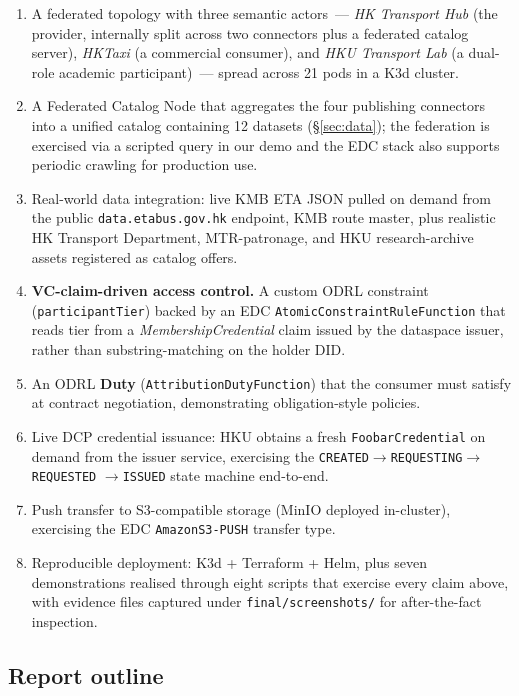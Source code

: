 \documentclass[11pt,a4paper]{article}
\DeclareRobustCommand{\code}[1]{\texttt{\small #1}}
\begin{document}
\begin{enumerate}
  \item A federated topology with three semantic actors~--- \emph{HK Transport
    Hub} (the provider, internally split across two connectors plus a federated
    catalog server), \emph{HKTaxi} (a commercial consumer), and \emph{HKU
    Transport Lab} (a dual-role academic participant)~--- spread across 21
    pods in a K3d cluster.
  \item A Federated Catalog Node that aggregates the four publishing
    connectors into a unified catalog containing 12 datasets
    (§\ref{sec:data}); the federation is exercised via a scripted query
    in our demo and the EDC stack also supports periodic crawling for
    production use.
  \item Real-world data integration: live KMB ETA JSON pulled on demand from
    the public \code{data.etabus.gov.hk} endpoint, KMB route master, plus
    realistic HK Transport Department, MTR-patronage, and HKU research-archive
    assets registered as catalog offers.
  \item \textbf{VC-claim-driven access control.} A custom ODRL constraint
    (\code{participantTier}) backed by an EDC
    \code{AtomicConstraintRuleFunction} that reads tier from a
    \emph{MembershipCredential} claim issued by the dataspace issuer, rather
    than substring-matching on the holder DID.
  \item An ODRL \textbf{Duty} (\code{AttributionDutyFunction}) that the
    consumer must satisfy at contract negotiation, demonstrating
    obligation-style policies.
  \item Live DCP credential issuance: HKU obtains a fresh
    \code{FoobarCredential} on demand from the issuer service, exercising the
    \code{CREATED}$\rightarrow$\code{REQUESTING}$\rightarrow$\code{REQUESTED}%
    $\rightarrow$\code{ISSUED} state machine end-to-end.
  \item Push transfer to S3-compatible storage (MinIO deployed in-cluster),
    exercising the EDC \code{AmazonS3-PUSH} transfer type.
  \item Reproducible deployment: K3d + Terraform + Helm, plus seven
    demonstrations realised through eight scripts that exercise every
    claim above, with evidence files captured under
    \code{final/screenshots/} for after-the-fact inspection.
\end{enumerate}

\subsection{Report outline}
\end{document}
